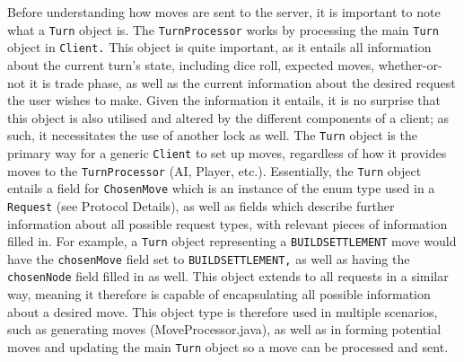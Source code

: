 \documentclass[a4paper,doc]{apa6}
\newcommand{\code}{\texttt}
\begin{document}
Before understanding how moves are sent to the server, it is important to note what a \code{Turn} object is. The \code{TurnProcessor} works by processing the main \code{Turn} object in \code{Client.} This object is quite important, as it entails all information about the current turn’s state, including dice roll, expected moves, whether-or-not it is trade phase, as well as the current information about the desired request the user wishes to make. Given the information it entails, it is no surprise that this object is also utilised and altered by the different components of a client; as such, it necessitates the use of another lock as well. The \code{Turn} object is the primary way for a generic \code{Client} to set up moves, regardless of how it provides moves to the \code{TurnProcessor} (AI, Player, etc.). Essentially, the \code{Turn} object entails a field for \code{ChosenMove} which is an instance of the enum type used in a \code{Request} (see Protocol Details), as well as fields which describe further information about all possible request types, with relevant pieces of information filled in. For example, a \code{Turn} object representing a \code{BUILDSETTLEMENT} move would have the \code{chosenMove} field set to \code{BUILDSETTLEMENT,} as well as having the \code{chosenNode} field filled in as well. This object extends to all requests in a similar way, meaning it therefore is capable of encapsulating all possible information about a desired move. This object type is therefore used in multiple scenarios, such as generating moves (MoveProcessor.java), as well as in forming potential moves and updating the main \code{Turn} object so a move can be processed and sent.
\end{document}
